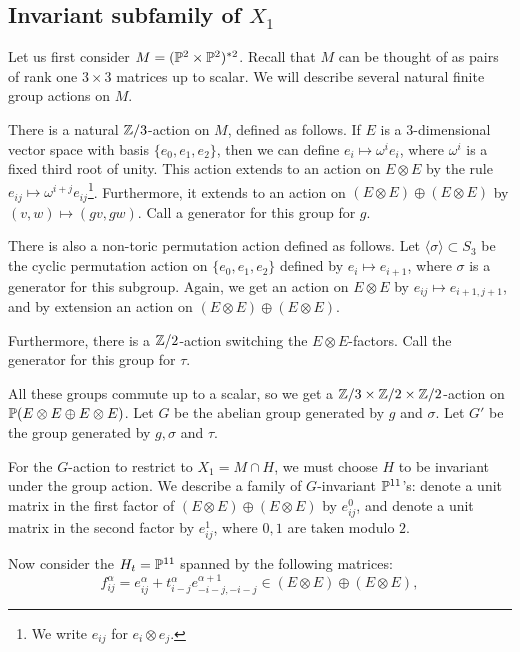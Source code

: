 \subsection{Invariant subfamily of $X_1$} 

Let us first consider $M=(\P^2 \times \P^2)^{\ast 2}$. Recall that $M$ can be thought of as pairs of rank one $3 \times 3$ matrices up to scalar. We will describe several natural finite group actions on $M$.

There is a natural $\Z/3$-action on $M$, defined as follows. If $E$ is a $3$-dimensional vector space with basis $\{e_0,e_1,e_2\}$, then we can define $e_i \mapsto \omega^i e_i$, where $\omega^i$ is a fixed third root of unity. This action extends to an action on $E \otimes E$ by the rule $e_{ij} \mapsto \omega^{i+j} e_{ij}$\footnote{We write $e_{ij}$ for $e_i \otimes e_j$.}. Furthermore, it extends to an action on $(E \otimes E) \oplus (E \otimes E)$ by $(v,w) \mapsto (gv,gw)$. Call a generator for this group for $g$. 

There is also a non-toric permutation action defined as follows. Let $\langle \sigma \rangle \subset S_3$ be the cyclic permutation action on $\{ e_0,e_1,e_2 \}$ defined by $e_i \mapsto e_{i+1}$, where $\sigma$ is a generator for this subgroup. Again, we get an action on $E \otimes E$ by $e_{ij} \mapsto e_{i+1,j+1}$, and by extension an action on $(E \otimes E) \oplus (E \otimes E)$.

Furthermore, there is a $\Z/2$-action switching the $E \otimes E$-factors. Call the generator for this group for $\tau$.

All these groups commute up to a scalar, so we get a $\Z/3 \times \Z/2 \times \Z/2$-action on $\P(E \otimes E \oplus E \otimes E)$. Let $G$ be the abelian group generated by $g$ and $\sigma$. Let $G'$ be the group generated by $g, \sigma$ and $\tau$. 

For the $G$-action to restrict to $X_1=M \cap H$, we must choose $H$ to be invariant under the group action. We describe a family of $G$-invariant $\P^{11}$'s: denote a unit matrix in the first factor of $(E \otimes E) \oplus (E \otimes E)$ by $e_{ij}^0$, and denote a unit matrix in the second factor by $e_{ij}^1$, where $0,1$ are taken modulo $2$. 

Now consider the $H_t=\P^{11}$ spanned by the following matrices:
\begin{equation}
\label{eq:fija}
f_{ij}^\alpha = e_{ij}^\alpha + t_{i-j}^\alpha e_{-i-j,-i-j}^{\alpha+1} \in (E \otimes E) \oplus (E \otimes E),
\end{equation}

